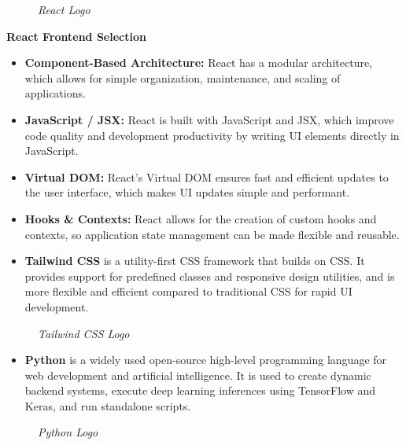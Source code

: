 \begin{figure}[H]
	\centering
	\caption{\textit{React Logo}}
\end{figure}

\textbf{\textbf{React Frontend Selection}}
\begin{itemize}
	\item[\textbf{o}] \textbf{Component-Based Architecture:} React has a modular architecture, which allows for simple organization, maintenance, and scaling of applications.
	\item[\textbf{o}] \textbf{JavaScript / JSX:} React is built with JavaScript and JSX, which improve code quality and development productivity by writing UI elements directly in JavaScript.
	\item[\textbf{o}] \textbf{Virtual DOM:} React's Virtual DOM ensures fast and efficient updates to the user interface, which makes UI updates simple and performant.
	\item[\textbf{o}] \textbf{Hooks \& Contexts:} React allows for the creation of custom hooks and contexts, so application state management can be made flexible and reusable.
\end{itemize}

\begin{itemize}
	\item \textbf{Tailwind CSS} is a utility-first CSS framework that builds on CSS. It provides support for predefined classes and responsive design utilities, and is more flexible and efficient compared to traditional CSS for rapid UI development.
\end{itemize}

\begin{figure}[H]
	\centering
	\caption{\textit{Tailwind CSS Logo}}
\end{figure}

\begin{itemize}
	\item \textbf{Python} is a widely used open-source high-level programming language for web development and artificial intelligence. It is used to create dynamic backend systems, execute deep learning inferences using TensorFlow and Keras, and run standalone scripts.
\end{itemize}

\begin{figure}[H]
	\centering
	\caption{\textit{Python Logo}}
\end{figure}

